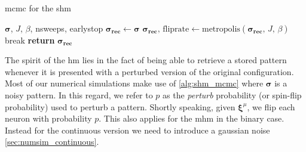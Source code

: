 \documentclass[\rootdir/main.tex]{subfiles}
\begin{document}
\begin{algorithm}
    \caption{\acrlong{mcmc} for the \acrlong{shm}}
    \label{alg:shm_mcmc}
    \begin{algorithmic}[1]
    \Require $\symbf{\sigma}$, $J$, $\beta$, nsweeps, earlystop
        \State $\symbf{\sigma_{\text{rec}}} \gets \symbf{\sigma}$ 
        \State $\symbf{\sigma_{\text{rec}}},\, \text{fliprate} \gets \text{metropolis}\left(\symbf{\sigma_{\text{rec}}},\, J,\, \beta \right)$  
            \State break
        \EndIf
        \EndFor
    \State \textbf{return} $\symbf{\sigma_{\text{rec}}}$
    \end{algorithmic}
\end{algorithm}

The spirit of the \acrlong{hm} lies in the fact of being able to retrieve a stored pattern whenever it is presented with a perturbed version of the original configuration.\\
Most of our numerical simulations make use of \cref{alg:shm_mcmc} where $\symbf{\sigma}$ is a noisy pattern. In this regard, we refer to $p$ as the \emph{perturb} probability (or spin-flip probability) used to perturb a pattern. Shortly speaking, given $\symbf{\xi}^{\mu}$, we flip each neuron with probability $p$. This also applies for the \acrlong{mhm} in the binary case. Instead for the continuous version we need to introduce a gaussian noise \cref{sec:numsim_continuous}.

\begin{comment}
We store $M = N \alpha$ patterns of length $N = 1000$. A random pattern is taken and perturbed with spin-flip probability $p = 0.2$ and the \acrlong{mcmc} is executed on the perturbed configuration for $\texttt{nsweeps} = 100$ with $\beta = 100$. Then the overlap between the retrieved state and the original one is measured. In \cref{fig:shm:p02:final_overlaps1} it can be clearly observed that there is a sharp peak centered at very high magnetization \ie $m \approx 1$. However, also a broad distribution centered at a lower value of $m$ appears.  
\begin{figure}
    \centering
    
    \caption{Final overlaps after \acrshort{mcmc} at low temperature. Here, the spin-flip probability is $p = 0.2$ and $500$ independent trials are made.}
    \label{fig:shm:p02:final_overlaps1}
\end{figure}
\end{comment}
\end{document}
